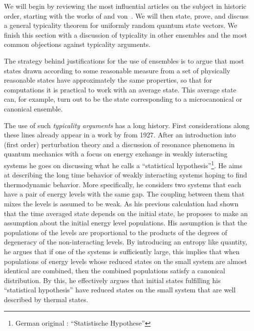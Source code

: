 \documentclass[a4paper,12pt,listof=totoc,index=totoc,bibliography=totoc,headsepline=false,headings=normal,BCOR16.153846mm,DIV12,headinclude,twoside,cleardoublepage=empty,numbers=noenddot,final]{scrreprt}
\theoremstyle{mystyle}
\numberwithin{equation}{section}
\numberwithin{figure}{section}
\numberwithin{lemma}{section}
\numberwithin{theorem}{section}
\numberwithin{corollary}{section}
\numberwithin{definition}{section}
\numberwithin{conjecture}{section}
\numberwithin{observation}{section}
\newcommand{\+}{\mkern2mu}
\DeclareMathOperator{\1}{\mathds{1}}
\begin{document}
We will begin by reviewing the most influential articles on the subject in historic order, starting with the works of \textcite{Schroedinger1927} and von~\textcite{vonneumann1929}.
We will then state, prove, and discuss a general typicality theorem for uniformly random quantum state vectors.
We finish this section with a discussion of typicality in other ensembles and the most common objections against typicality arguments.

The strategy behind justifications for the use of ensembles is to argue that most states drawn according to some reasonable measure from a set of physically reasonable states have approximately the same properties, so that for computations it is practical to work with an average state.
This average state can, for example, turn out to be the state corresponding to a microcanonical or canonical ensemble.

The use of such \emph{typicality arguments} has a long history.
First considerations along these lines already appear in a work by \textcite{Schroedinger1927} from 1927.
After an introduction into (first order) perturbation theory and a discussion of resonance phenomena in quantum mechanics with a focus on energy exchange in weakly interacting systems he goes on discussing what he calls a ``statistical hypothesis''\footnote{German original \cite{Schroedinger1927}: \foreignlanguage{ngerman}{``Statistische Hypothese''}}.
He aims at describing the long time behavior of weakly interacting systems hoping to find thermodynamic behavior.
More specifically, he considers two systems that each have a pair of energy levels with the same gap.
The coupling between them that mixes the levels is assumed to be weak.
As his previous calculation had shown that the time averaged state depends on the initial state, he proposes to make an assumption about the initial energy level populations.
His assumption is that the populations of the levels are proportional to the products of the degrees of degeneracy of the non-interacting levels.
By introducing an entropy like quantity, he argues that if one of the systems is sufficiently large, this implies that when populations of energy levels whose reduced states on the small system are almost identical are combined, then the combined populations satisfy a canonical distribution.
By this, he effectively argues that initial states fulfilling his ``statistical hypothesis'' have reduced states on the small system that are well described by thermal states.
\end{document}
